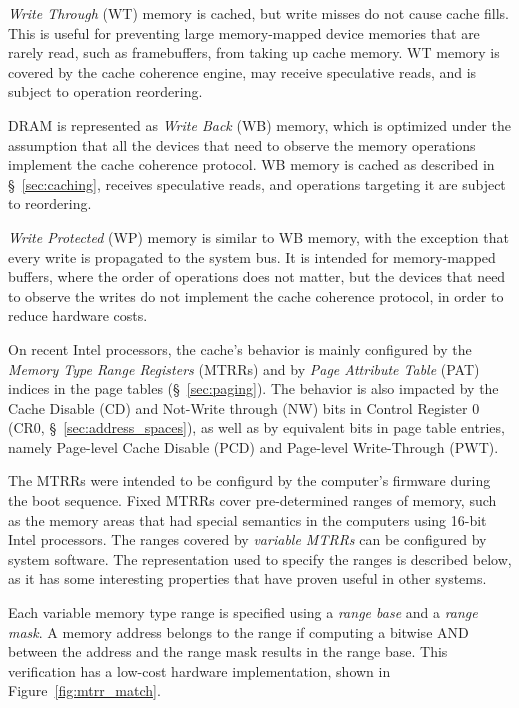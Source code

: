 \textit{Write Through} (WT) memory is cached, but write misses do not cause
cache fills. This is useful for preventing large memory-mapped device memories
that are rarely read, such as framebuffers, from taking up cache memory. WT
memory is covered by the cache coherence engine, may receive speculative reads,
and is subject to operation reordering.

DRAM is represented as \textit{Write Back} (WB) memory, which is optimized
under the assumption that all the devices that need to observe the memory
operations implement the cache coherence protocol. WB memory is cached as
described in \S~\ref{sec:caching}, receives speculative reads, and operations
targeting it are subject to reordering.

\textit{Write Protected} (WP) memory is similar to WB memory, with the
exception that every write is propagated to the system bus. It is intended for
memory-mapped buffers, where the order of operations does not matter, but the
devices that need to observe the writes do not implement the cache coherence
protocol, in order to reduce hardware costs.


On recent Intel processors, the cache's behavior is mainly configured by the
\textit{Memory Type Range Registers} (MTRRs) and by
\textit{Page Attribute Table} (PAT) indices in the page tables
(\S~\ref{sec:paging}). The behavior is also impacted by the Cache Disable (CD)
and Not-Write through (NW) bits in Control Register 0
(CR0, \S~\ref{sec:address_spaces}), as well as by equivalent bits in page table
entries, namely Page-level Cache Disable (PCD) and Page-level Write-Through
(PWT).

The MTRRs were intended to be configurd by the computer's firmware during the
boot sequence. Fixed MTRRs cover pre-determined ranges of memory, such as the
memory areas that had special semantics in the computers using 16-bit Intel
processors. The ranges covered by \textit{variable MTRRs} can be configured by
system software. The representation used to specify the ranges is described
below, as it has some interesting properties that have proven useful in other
systems.


Each variable memory type range is specified using a \textit{range base} and a
\textit{range mask}. A memory address belongs to the range if computing a
bitwise AND between the address and the range mask results in the range base.
This verification has a low-cost hardware implementation, shown in
Figure~\ref{fig:mtrr_match}.

